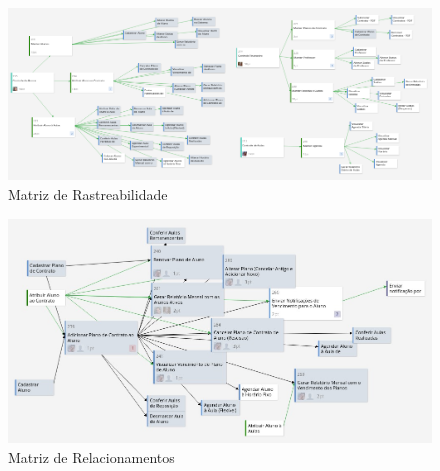 \begin{figure}[!htb]
    \centering
    \includegraphics[width=1.4\textwidth, angle=-90]{figuras/matriz_rastreabilidade.png}
    \caption{Matriz de Rastreabilidade}
    \label{fig:matriz_rastreabilidade}
\end{figure}

\begin{figure}[!htb]
    \centering
    \includegraphics[width=\textwidth]{figuras/matriz_relacionamentos.jpeg}
    \caption{Matriz de Relacionamentos}
    \label{fig:matriz_relacionamentos}
\end{figure}
